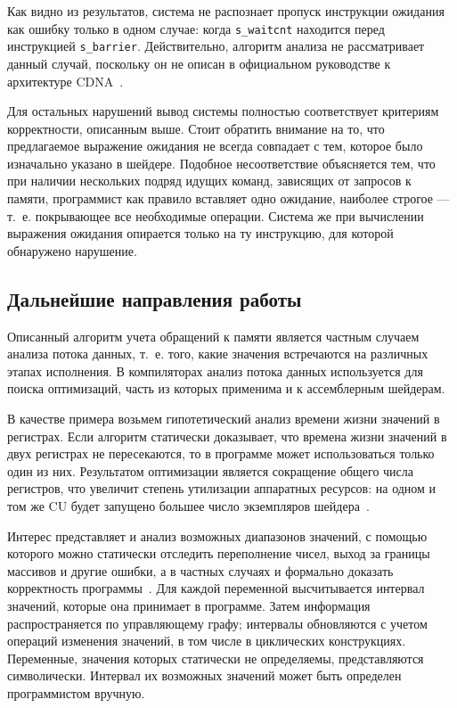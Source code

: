 \documentclass[a4paper,14pt]{extarticle}
\begin{document}
{Как видно из результатов, система не распознает пропуск инструкции ожидания как ошибку только
в одном случае: когда \verb|s_waitcnt| находится перед инструкцией \verb|s_barrier|. Действительно,
алгоритм анализа не рассматривает данный случай, поскольку он не описан в официальном руководстве
к архитектуре CDNA~\cite{cdna-isa}.

Для остальных нарушений вывод системы полностью соответствует критериям корректности, описанным
выше. Стоит обратить внимание на то, что предлагаемое выражение ожидания не всегда совпадает
с тем, которое было изначально указано в шейдере. Подобное несоответствие объясняется тем,
что при наличии нескольких подряд идущих команд, зависящих от запросов к памяти,
программист как правило вставляет одно ожидание, наиболее строгое — т.~е. покрывающее все
необходимые операции. Система же при вычислении выражения ожидания опирается только
на ту инструкцию, для которой обнаружено нарушение.

\subsection{Дальнейшие направления работы}
\label{section:future-work}

Описанный алгоритм учета обращений к памяти является частным случаем анализа потока данных,
т.~е. того, какие значения встречаются на различных этапах исполнения. В компиляторах
анализ потока данных используется для поиска оптимизаций, часть из которых применима и к
ассемблерным шейдерам.

В качестве примера возьмем гипотетический анализ времени жизни значений в регистрах. Если алгоритм
статически доказывает, что времена жизни значений в двух регистрах не пересекаются, то
в программе может использоваться только один из них. Результатом оптимизации
является сокращение общего числа регистров, что увеличит степень утилизации аппаратных ресурсов:
на одном и том же CU будет запущено большее число экземпляров шейдера~\cite{gcn-performance}.

Интерес представляет и анализ возможных диапазонов значений, с помощью которого можно
статически отследить переполнение чисел, выход за границы массивов и другие ошибки,
а в частных случаях и формально доказать корректность программы~\cite{value-range-analysis}.
Для каждой переменной высчитывается интервал значений, которые она принимает в программе.
Затем информация распространяется по управляющему графу; интервалы обновляются с
учетом операций изменения значений, в том числе в циклических конструкциях.
Переменные, значения которых статически не определяемы, представляются символически.
Интервал их возможных значений может быть определен программистом вручную.

}
\end{document}
